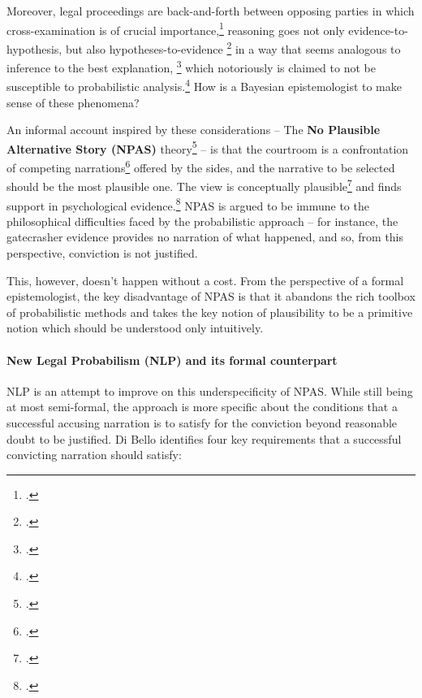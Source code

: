 \documentclass[11pt, a4paper]{article}
\begin{document}
Moreover, legal proceedings are back-and-forth between opposing parties in which  cross-examination is of crucial importance,\footcite{Stein2005Foundations-of-}  reasoning goes not only evidence-to-hypothesis, but also hypotheses-to-evidence \footcite{wells1992naked,allen2007problematic} in a way that seems analogous to inference to the best explanation, \footcite{dant1988gambling} which notoriously is claimed to not be susceptible to probabilistic analysis.\footcite{Lipton2004-LIPITT} How is a Bayesian epistemologist to make sense of these phenomena? 



 An informal account inspired by these considerations --    The \textbf{No Plausible Alternative Story (NPAS)} theory\footcite{allen2010no}  -- is that the courtroom is a confrontation of competing narrations\footcite{wagenaar1993anchored,ho2008philosophy} offered by the sides, and  the narrative to be selected should be the most plausible one. The view is conceptually plausible\footcite{di2013statistics} and finds  support  in psychological evidence.\footcite{pennington1991cognitive,pennington1992explaining}  NPAS  is argued to be immune to the philosophical difficulties faced by  the probabilistic approach -- for instance, the gatecrasher evidence provides no narration of what happened, and so, from this perspective, conviction is not justified.

 
This, however, doesn't happen without a cost. From the perspective of a formal epistemologist,  the key disadvantage of NPAS is that it abandons the rich toolbox of probabilistic methods and takes the key notion of plausibility to be a primitive notion which should be understood only intuitively. 

\vspace{-6mm}

\paragraph{New Legal Probabilism  (NLP) and its formal counterpart}
 NLP  is an attempt to improve on this underspecificity of NPAS. While still being at most semi-formal, the approach is more specific about the conditions that a successful accusing narration is to satisfy for the conviction beyond reasonable doubt to be justified. Di Bello identifies four key requirements that a successful convicting narration should satisfy:

\vspace{-2mm}
\end{document}

